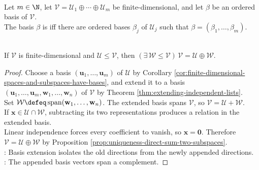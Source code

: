 \begin{definition} \label{def:adapted-basis-direct-sum} \\
Let $m\in\N$, let $\mathcal{V}=\mathcal{U}_1\oplus\cdots\oplus\mathcal{U}_m$ be finite-dimensional, and let $\beta$ be an ordered basis of $\mathcal{V}$.\\
The basis $\beta$ is  iff there are ordered bases $\beta_j$ of $\mathcal{U}_j$ such that $\beta=(\beta_1,\ldots,\beta_m)$.
\end{definition}

\begin{proposition} \label{prop:complements-exist-finite-dimensions} \\
If $\mathcal{V}$ is finite-dimensional and $\mathcal{U}\leq\mathcal{V}$, then $(\exists\,\mathcal{W}\leq\mathcal{V})\,\mathcal{V}=\mathcal{U}\oplus\mathcal{W}$.
\begin{proof}
Choose a basis $(\mathbf{u}_1,\ldots,\mathbf{u}_m)$ of $\mathcal{U}$ by Corollary \ref{cor:finite-dimensional-spaces-and-subspaces-have-bases}, and extend it to a basis $(\mathbf{u}_1,\ldots,\mathbf{u}_m,\mathbf{w}_1,\ldots,\mathbf{w}_n)$ of $\mathcal{V}$ by Theorem \ref{thm:extending-independent-lists}.\\
Set $\mathcal{W}\defeq\operatorname{span}(\mathbf{w}_1,\ldots,\mathbf{w}_n)$. The extended basis spans $\mathcal{V}$, so $\mathcal{V}=\mathcal{U}+\mathcal{W}$.\\
If $\mathbf{x}\in\mathcal{U}\cap\mathcal{W}$, subtracting its two representations produces a relation in the extended basis.\\
Linear independence forces every coefficient to vanish, so $\mathbf{x}=\mathbf{0}$. Therefore $\mathcal{V}=\mathcal{U}\oplus\mathcal{W}$ by Proposition \ref{prop:uniqueness-direct-sum-two-subspaces}.\\
: Basis extension isolates the old directions from the newly appended directions.\\
: The appended basis vectors span a complement.
\end{proof}
\end{proposition}


